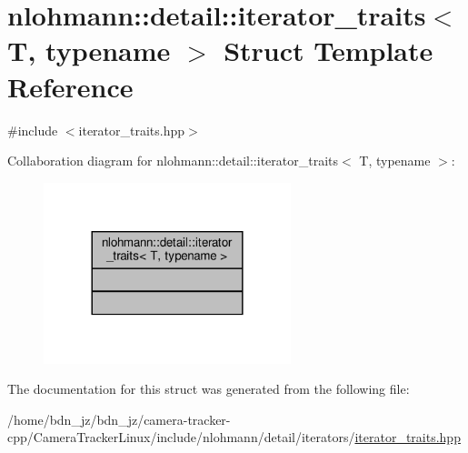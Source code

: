 \hypertarget{structnlohmann_1_1detail_1_1iterator__traits}{}\section{nlohmann\+:\+:detail\+:\+:iterator\+\_\+traits$<$ T, typename $>$ Struct Template Reference}
\label{structnlohmann_1_1detail_1_1iterator__traits}


{\ttfamily \#include $<$iterator\+\_\+traits.\+hpp$>$}



Collaboration diagram for nlohmann\+:\+:detail\+:\+:iterator\+\_\+traits$<$ T, typename $>$\+:\nopagebreak
\begin{figure}[H]
\begin{center}
\leavevmode
\includegraphics[width=204pt]{structnlohmann_1_1detail_1_1iterator__traits__coll__graph}
\end{center}
\end{figure}


The documentation for this struct was generated from the following file\+:\begin{DoxyCompactItemize}
\item 
/home/bdn\+\_\+jz/bdn\+\_\+jz/camera-\/tracker-\/cpp/\+Camera\+Tracker\+Linux/include/nlohmann/detail/iterators/\hyperlink{iterator__traits_8hpp}{iterator\+\_\+traits.\+hpp}\end{DoxyCompactItemize}
